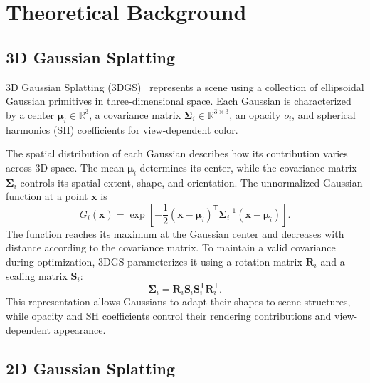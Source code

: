 \chapter{Theoretical Background}

\section{3D Gaussian Splatting}

3D Gaussian Splatting (3DGS)~\cite{kerbl2023} represents a scene using a collection of ellipsoidal Gaussian primitives in three-dimensional space. Each Gaussian is characterized by a center \(\boldsymbol{\mu}_i \in \mathbb{R}^3\), a covariance matrix \(\boldsymbol{\Sigma}_i \in \mathbb{R}^{3 \times 3}\), an opacity \(o_i\), and spherical harmonics (SH) coefficients for view-dependent color.

The spatial distribution of each Gaussian describes how its contribution varies across 3D space. The mean \(\boldsymbol{\mu}_i\) determines its center, while the covariance matrix \(\boldsymbol{\Sigma}_i\) controls its spatial extent, shape, and orientation. The unnormalized Gaussian function at a point \(\mathbf{x}\) is
\begin{equation}
  G_i(\mathbf{x}) =
  \exp\left[-\frac{1}{2}
    (\mathbf{x}-\boldsymbol{\mu}_i)^{\mathsf{T}}
    \boldsymbol{\Sigma}_i^{-1}
    (\mathbf{x}-\boldsymbol{\mu}_i)\right].
  \label{eq:gaussian-3d}
\end{equation}
The function reaches its maximum at the Gaussian center and decreases with distance according to the covariance matrix. To maintain a valid covariance during optimization, 3DGS parameterizes it using a rotation matrix \(\mathbf{R}_i\) and a scaling matrix \(\mathbf{S}_i\):
\[
  \boldsymbol{\Sigma}_i =
  \mathbf{R}_i\mathbf{S}_i\mathbf{S}_i^{\mathsf{T}}\mathbf{R}_i^{\mathsf{T}}.
\]
This representation allows Gaussians to adapt their shapes to scene structures, while opacity and SH coefficients control their rendering contributions and view-dependent appearance.

\section{2D Gaussian Splatting}

